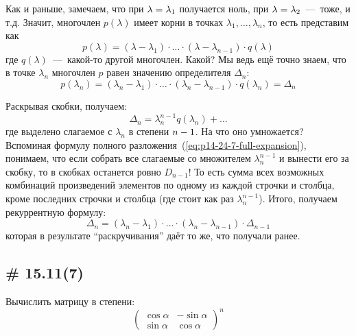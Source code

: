 \documentclass[a4paper,12pt]{article}
\theoremstyle{remark}
\begin{document}
\begin{solution}
    Как и раньше, замечаем, что при $\lambda \hm= \lambda_1$ получается ноль, при $\lambda \hm= \lambda_2$~---~тоже, и т.д.
    Значит, многочлен $p(\lambda)$ имеет корни в точках $\lambda_1, \ldots, \lambda_n$, то есть представим как
    \[
      p(\lambda) = (\lambda - \lambda_1) \cdot \ldots \cdot (\lambda - \lambda_{n-1}) \cdot q(\lambda)
    \]
    где $q(\lambda)$~---~какой-то другой многочлен.
    Какой?
    Мы ведь ещё точно знаем, что в точке $\lambda_n$ многочлен $p$ равен значению определителя $\Delta_n$:
    \[
      p(\lambda_n) = (\lambda_n - \lambda_1) \cdot \ldots \cdot (\lambda_n - \lambda_{n-1}) \cdot q(\lambda_n) = \Delta_n
    \]
    
    Раскрывая скобки, получаем:
    \[
      \Delta_n = \lambda_n^{n-1} q(\lambda_n) + \ldots
    \]
    где выделено слагаемое с $\lambda_n$ в степени $n \hm- 1$.
    На что оно умножается?
    Вспоминая формулу полного разложения~(\ref{eq:p14-24-7-full-expansion}), понимаем, что если собрать все слагаемые со множителем $\lambda_n^{n-1}$ и вынести его за скобку, то в скобках останется ровно $D_{n-1}$!
    То есть сумма всех возможных комбинаций произведений элементов по одному из каждой строчки и столбца, кроме последних строчки и столбца (где стоит как раз $\lambda_n^{n-1}$).
    Итого, получаем рекуррентную формулу:
    \[
      \Delta_n = (\lambda_n - \lambda_1) \cdot \ldots \cdot (\lambda_n - \lambda_{n-1}) \cdot \Delta_{n-1}
    \]
    которая в результате ``раскручивания'' даёт то же, что получали ранее.
  \end{solution}
  
  
  \subsection{\# 15.11(7)}
  
  Вычислить матрицу в степени:
  \[
    \begin{pmatrix}
      \cos \alpha & -\sin \alpha\\
      \sin \alpha & \cos \alpha
    \end{pmatrix}^n
  \]
  
\end{document}
